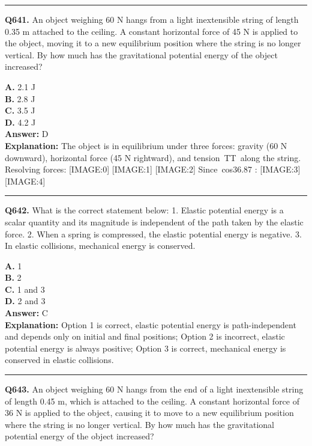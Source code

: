 \documentclass[12pt]{article}
\begin{document}
\hrule
\vspace{1em}


\noindent
\textbf{Q641.} An object weighing 60 N hangs from a light inextensible string of length 0.35 m attached to the ceiling. A constant horizontal force of 45 N is applied to the object, moving it to a new equilibrium position where the string is no longer vertical. By how much has the gravitational potential energy of the object increased?



\textbf{A.} 2.1 J \\
\textbf{B.} 2.8 J \\
\textbf{C.} 3.5 J \\
\textbf{D.} 4.2 J \\

\textbf{Answer:} D \\
\textbf{Explanation:} The object is in equilibrium under three forces: gravity (60 N downward), horizontal force (45 N rightward), and tension TT along the string. Resolving forces:
[IMAGE:0]
[IMAGE:1]
[IMAGE:2]
Since cos36.87
:
[IMAGE:3]
[IMAGE:4]

\hrule
\vspace{1em}


\noindent
\textbf{Q642.} What is the correct statement below:
1.
Elastic potential energy is a scalar quantity and its magnitude is independent of the path taken by the elastic force.
2.
When a spring is compressed, the elastic potential energy is negative.
3.
In elastic collisions, mechanical energy is conserved.



\textbf{A.} 1 \\
\textbf{B.} 2 \\
\textbf{C.} 1 and 3 \\
\textbf{D.} 2 and 3 \\

\textbf{Answer:} C \\
\textbf{Explanation:} Option 1 is correct, elastic potential energy is path-independent and depends only on initial and final positions; Option 2 is incorrect, elastic potential energy is always positive; Option 3 is correct, mechanical energy is conserved in elastic collisions.

\hrule
\vspace{1em}


\noindent
\textbf{Q643.} An object weighing 60 N hangs from the end of a light inextensible string of length 0.45 m, which is attached to the ceiling. A constant horizontal force of 36 N is applied to the object, causing it to move to a new equilibrium position where the string is no longer vertical. By how much has the gravitational potential energy of the object increased?
\end{document}
